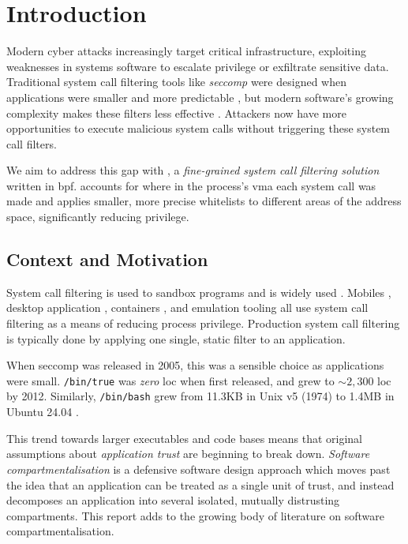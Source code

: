 \section{Introduction}

Modern cyber attacks increasingly target critical infrastructure, exploiting
weaknesses in systems software to escalate privilege or exfiltrate sensitive
data. Traditional system call filtering tools like \textit{seccomp} were designed when
applications were smaller and more predictable \cite{arcangeli_seccomp_2005, SYSFILTER}, but modern software's growing
complexity makes these filters less effective \cite{OPTIMUS}. Attackers now have more
opportunities to execute malicious system calls without triggering these system
call filters. 

We aim to address this gap with \af, a \textit{fine-grained system call
filtering solution} written in \ac{bpf}. \af accounts for where in the process's \ac{vma} each
system call was made and applies smaller, more precise whitelists to
different areas of the address space, significantly reducing privilege.

\subsection{Context and Motivation}

System call filtering is used to sandbox programs and is widely used
\cite{BSIDE}. Mobiles \cite{android_seccomp_oreo},
desktop application \cite{flatpak_seccomp_profile}, containers \cite{docker_seccomp}, and emulation tooling all use system call
filtering as a means of reducing process privilege. Production system call
filtering is typically done by applying one single, static filter to an
application. 

When seccomp was released in 2005, this was a sensible choice as
applications were small. \texttt{/bin/true} was \textit{zero} \ac{loc} when
first released, and grew to $\sim2,300$ \ac{loc} by 2012. Similarly,
\texttt{/bin/bash} grew from 11.3KB in Unix v5 (1974) to 1.4MB in Ubuntu 24.04
\cite{SYSFILTER}.

This trend towards larger executables and code bases means that original
assumptions about \textit{application trust} are beginning to break down.
\textit{Software compartmentalisation} \cite{SOK} is a defensive software design approach
which moves past the idea that an application can be treated as a single unit of
trust, and instead decomposes an application into several isolated, mutually
distrusting compartments. This report adds to the growing body of literature on
software compartmentalisation.

